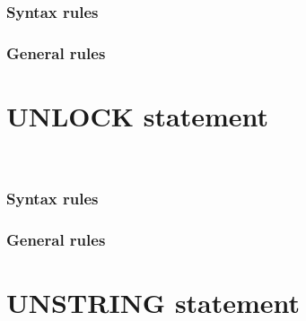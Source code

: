 \subsubsection{Syntax rules}

\subsubsection{General rules}

\section{UNLOCK statement}

\begin{syntax}
   \filename
  \begin{0-1}
     \\
  \end{0-1}
\end{syntax}

\subsubsection{Syntax rules}

\subsubsection{General rules}

\section{UNSTRING statement}

